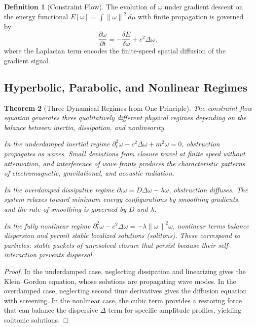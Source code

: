 \documentclass[12pt,a4paper,openany]{book}
\theoremstyle{plain}
\newtheorem{theorem}{Theorem}[chapter]
\theoremstyle{definition}
\newtheorem{definition}[theorem]{Definition}
\theoremstyle{remark}
\newcommand{\norm}[1]{\left\|#1\right\|}
\begin{document}
\begin{definition}[Constraint Flow]
The evolution of $\omega$ under gradient descent on the energy functional $E[\omega] = \int\norm{\omega}^2\,d\mu$ with finite propagation is governed by
\[
\frac{\partial\omega}{\partial t} = -\frac{\delta E}{\delta\omega} + c^2\Delta\omega,
\]
where the Laplacian term encodes the finite-speed spatial diffusion of the gradient signal.
\end{definition}

\subsection{Hyperbolic, Parabolic, and Nonlinear Regimes}

\begin{theorem}[Three Dynamical Regimes from One Principle]
The constraint flow equation generates three qualitatively different physical regimes depending on the balance between inertia, dissipation, and nonlinearity.

In the underdamped inertial regime $\partial_t^2\omega - c^2\Delta\omega + m^2\omega = 0$, obstruction propagates as waves. Small deviations from closure travel at finite speed without attenuation, and interference of wave fronts produces the characteristic patterns of electromagnetic, gravitational, and acoustic radiation.

In the overdamped dissipative regime $\partial_t\omega = D\Delta\omega - \lambda\omega$, obstruction diffuses. The system relaxes toward minimum energy configurations by smoothing gradients, and the rate of smoothing is governed by $D$ and $\lambda$.

In the fully nonlinear regime $\partial_t^2\omega - c^2\Delta\omega = -\lambda\norm{\omega}^2\omega$, nonlinear terms balance dispersion and permit stable localized solutions (solitons). These correspond to particles: stable packets of unresolved closure that persist because their self-interaction prevents dispersal.
\end{theorem}

\begin{proof}
In the underdamped case, neglecting dissipation and linearizing gives the Klein--Gordon equation, whose solutions are propagating wave modes. In the overdamped case, neglecting second time derivatives gives the diffusion equation with screening. In the nonlinear case, the cubic term provides a restoring force that can balance the dispersive $\Delta$ term for specific amplitude profiles, yielding solitonic solutions.
\end{proof}
\end{document}
